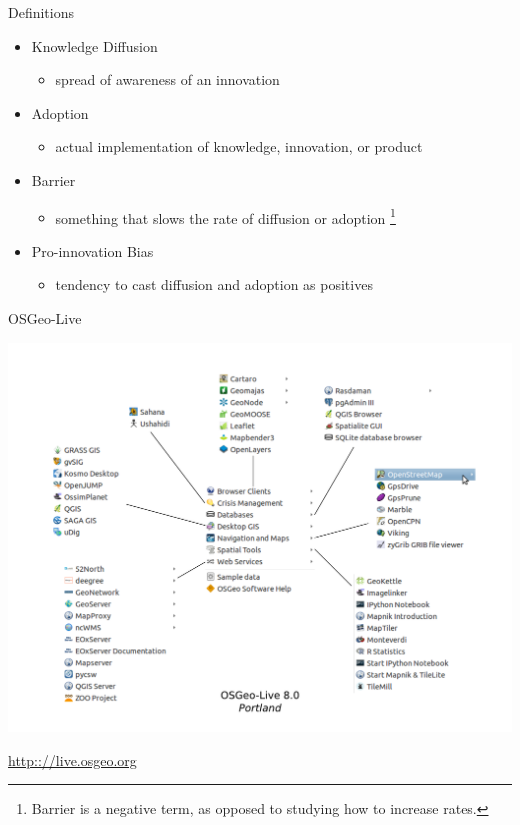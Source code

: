 \documentclass{beamer}
\begin{document}
\begin{frame}{Definitions}
	\begin{itemize}
		\item Knowledge Diffusion
		\begin{itemize}
			\item spread of awareness of an innovation
		\end{itemize}				
		
		\item Adoption
		\begin{itemize}
			\item actual implementation of knowledge, innovation, or product
		\end{itemize}						
		\item Barrier
		\begin{itemize}
			\item something that slows the rate of diffusion or adoption \footnote{Barrier is a negative term, as opposed to studying how to increase rates.}
		\end{itemize}						
		\item Pro-innovation Bias
		\begin{itemize}
			\item tendency to cast diffusion and adoption as positives
		\end{itemize}					
	\end{itemize}

\end{frame}



\begin{frame}{OSGeo-Live}
\begin{minipage}{\textwidth}
		\begin{center}
			\includegraphics[width=1.0\textwidth]{livemenu8.pdf}
		\end{center}
		\url{http:://live.osgeo.org}
	\end{minipage}
\end{frame}
\end{document}
